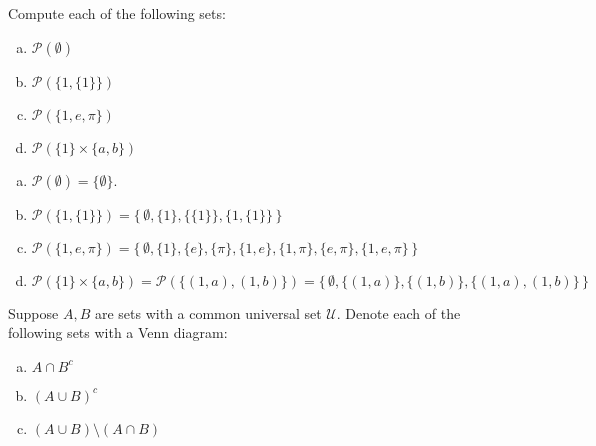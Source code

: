 \documentclass[11pt,letterpaper]{article}
\begin{document}
\newpage





 Compute each of the following sets:
        \begin{enumerate}[(a)]
        \item $\mathscr{P}(\emptyset)$
        \item $\mathscr{P}(\{ 1, \{ 1 \} \})$
        \item $\mathscr{P}(\{ 1, e, \pi \})$
        \item $\mathscr{P}( \{ 1 \} \times \{ a, b \})$
        \end{enumerate} \pspace

\sol
\begin{enumerate}[(a)]
\item $\mathscr{P}(\emptyset)= \{ \emptyset \}$.

\item $\mathscr{P}(\{ 1, \{ 1 \} \})= \{\, \emptyset, \{ 1 \}, \{ \{1 \} \}, \{ 1, \{ 1 \} \} \,\}$ 

\item $\mathscr{P}(\{ 1, e, \pi \})= \{\, \emptyset, \{ 1 \}, \{ e \}, \{ \pi \}, \{ 1, e \}, \{ 1, \pi \}, \{ e, \pi \}, \{ 1, e, \pi \} \,\}$

\item $\mathscr{P}( \{ 1 \} \times \{ a, b \})= \mathscr{P}( \{ (1, a), (1, b) \})= \{\, \emptyset, \{ (1, a) \}, \{ (1, b) \}, \{ (1, a), (1, b) \} \,\}$
\end{enumerate}





\newpage





 Suppose $A, B$ are sets with a common universal set $\mathscr{U}$. Denote each of the following sets with a Venn diagram: 
	\begin{enumerate}[(a)]
	\item $A \cap B^c$
	\item $(A \cup B)^c$
	\item $(A \cup B) \setminus (A \cap B)$
	\end{enumerate} \pspace
\end{document}
